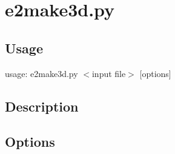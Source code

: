 \section{e2make3d.py}  \label{e2make3d.py}
\subsection{Usage}
usage: e2make3d.py $<$input file$>$ [options]


\subsection{Description}

\subsection{Options}

